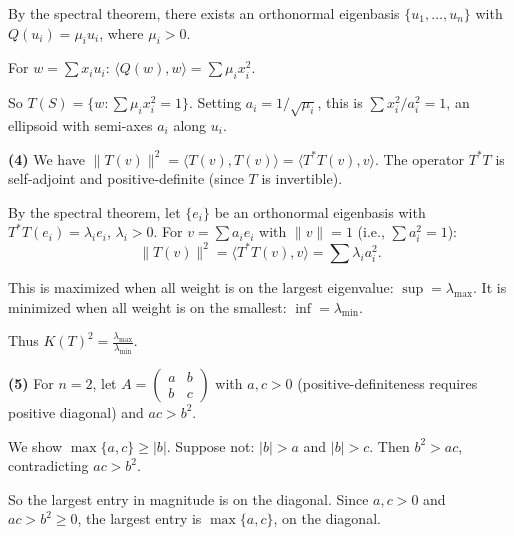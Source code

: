 \documentclass{report}
\begin{document}
\begin{solution}
 By the spectral theorem, there exists an orthonormal eigenbasis \(\{u_1, \ldots, u_n\}\) with \(Q(u_i) = \mu_i u_i\), where \(\mu_i > 0\).

For \(w = \sum x_i u_i\): \(\langle Q(w), w \rangle = \sum \mu_i x_i^2\).

So \(T(S) = \{w : \sum \mu_i x_i^2 = 1\}\). Setting \(a_i = 1/\sqrt{\mu_i}\), this is \(\sum x_i^2/a_i^2 = 1\), an ellipsoid with semi-axes \(a_i\) along \(u_i\).

\textbf{(4)} We have \(\|T(v)\|^2 = \langle T(v), T(v) \rangle = \langle T^*T(v), v \rangle\). The operator \(T^*T\) is self-adjoint and positive-definite (since \(T\) is invertible).

By the spectral theorem, let \(\{e_i\}\) be an orthonormal eigenbasis with \(T^*T(e_i) = \lambda_i e_i\), \(\lambda_i > 0\). For \(v = \sum a_i e_i\) with \(\|v\| = 1\) (i.e., \(\sum a_i^2 = 1\)):
\[\|T(v)\|^2 = \langle T^*T(v), v \rangle = \sum \lambda_i a_i^2.\]

This is maximized when all weight is on the largest eigenvalue: \(\sup = \lambda_{\max}\).
It is minimized when all weight is on the smallest: \(\inf = \lambda_{\min}\).

Thus \(K(T)^2 = \frac{\lambda_{\max}}{\lambda_{\min}}\).

\textbf{(5)} For \(n = 2\), let \(A = \begin{pmatrix} a & b \\ b & c \end{pmatrix}\) with \(a, c > 0\) (positive-definiteness requires positive diagonal) and \(ac > b^2\).

We show \(\max\{a, c\} \geq |b|\). Suppose not: \(|b| > a\) and \(|b| > c\). Then \(b^2 > ac\), contradicting \(ac > b^2\).

So the largest entry in magnitude is on the diagonal. Since \(a, c > 0\) and \(ac > b^2 \geq 0\), the largest entry is \(\max\{a, c\}\), on the diagonal.
\end{solution}
\end{document}
